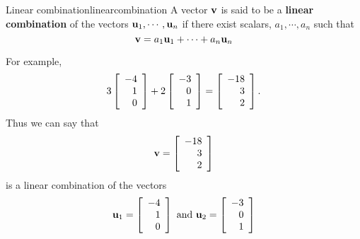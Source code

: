 \begin{definition}{Linear combination}{linearcombination}
A vector ${\bf v}$ is said to be a \textbf{linear combination} of the vectors ${\bf u}_1,\cdots , {\bf u}_n $ 
if there exist scalars, $a_{1},\cdots ,a_{n}$ such
that
\begin{equation*}
{\bf v} = a_1 {\bf u}_1 + \cdots + a_n {\bf u}_n
\end{equation*}
\end{definition}

For example, 
\begin{equation*}
3
\left[
\begin{array}{r}
-4 \\
1 \\
0
\end{array}
\right]
+
2
\left[
\begin{array}{r}
-3 \\
0\\
1
\end{array}
\right]
 =
\left[
\begin{array}{r}
-18 \\
3 \\
2
\end{array}
\right]. 
\end{equation*}
Thus we can say that
\begin{equation*}
{\bf v}= \left[
\begin{array}{r}
-18 \\
3 \\
2
\end{array}
\right]
\end{equation*}
is a linear combination of the vectors 
\begin{equation*}
{\bf u}_1 = \left[
\begin{array}{r}
-4 \\
1 \\
0
\end{array}
\right]
\mbox{ and } 
{\bf u}_2 = 
\left[
\begin{array}{r}
-3 \\
0\\
1
\end{array}
\right]
\end{equation*}

